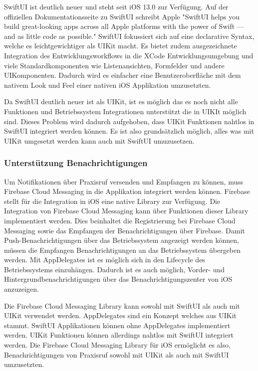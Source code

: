 SwiftUI ist deutlich neuer und steht seit iOS 13.0 zur Verfügung.
Auf der offiziellen Dokumentationsseite zu SwiftUI schreibt Apple "SwiftUI helps you build great-looking apps across all Apple platforms with the power of Swift — and as little code as possible."\cite{ios_swift_ui}
SwiftUI fokussiert sich auf eine declarative Syntax, welche es leichtgewichtiger als UIKit macht.
Es bietet zudem ausgezeichnete Integration des Entwicklungsworkflows in die XCode Entwicklungsumgebung und viele Standardkomponenten wie Listenansichten, Formfelder und andere UIKomponenten.
Dadurch wird es einfacher eine Benutzeroberfläche mit dem nativem Look und Feel einer nativen iOS Applikation umzusetzten.

Da SwiftUI deutlich neuer ist als UIKit, ist es möglich das es noch nicht alle Funktionen und Betriebssystem Integrationen unterstützt die in UIKIt möglich sind.
Dieses Problem wird dadurch aufgehoben, dass UIKit Funktionen nahtlos in SwiftUI integriert werden können.\cite{ios_swift_ui_uikit}
Es ist also grundsätzlich möglich, alles was mit UIKit umgesetzt werden kann auch mit SwiftUI umuzusetzen.

\clearpage

\subsubsection*{Unterstützung Benachrichtigungen}

Um Notifikationen über Praxisruf versenden und Empfangen zu können, muss Firebase Cloud Messaging in die Applikation integriert werden können. 
Firebase stellt für die Integration in iOS eine native Library zur Verfügung.\cite{firebase_github_ios} 
Die Integration von Firebase Cloud Messaging kann über Funktionen dieser Library implementiert werden.
Dies beinhaltet die Registrierung bei Firebase Cloud Messaging sowie das Empfangen der Benachrichtigungen über Firebase. \cite{firebase_ios}
Damit Push-Benachrichtigungen über das Betriebssystem angezeigt werden können, müssen die Empfangen Benachrichtigungen an das Betriebssystem übergeben werden.
Mit AppDelegates ist es möglich sich in den Lifecycle des Betriebssystems einzuhängen\cite{ios_app_delegate}.
Dadurch ist es auch möglich, Vorder- und Hintergrundbenachrichtigungen über das Benachrichtigungszenter von iOS anzuzeigen\cite{firebase_ios}.

Die Firebase Cloud Messaging Library kann sowohl mit SwiftUI als auch mit UIKit verwendet werden.
AppDelegates sind ein Konzept welches aus UIKit stammt\cite{ios_app_delegate}.
SwiftUI Applikationen können ohne AppDelegates implementiert werden.
UIKit Funktionen können allerdings nahtlos mit SwiftUI integriert werden.\cite{ios_swift_ui_uikit}
Die Firebase Cloud Messaging Library für iOS ermöglicht es also, Benachrichtigungen von Praxisruf sowohl mit UIKit als auch mit SwiftUI umzusetzten.


